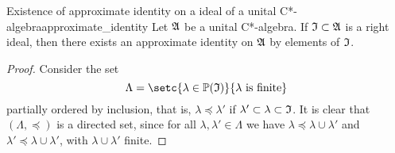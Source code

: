 \begin{theorem}{Existence of approximate identity on a ideal of a unital C*-algebra}{approximate_identity}
    Let \(\mathfrak{A}\) be a unital C*-algebra. If \(\mathfrak{I} \subset \mathfrak{A}\) is a right ideal, then there exists an approximate identity on \(\mathfrak{A}\) by elements of \(\mathfrak{I}\).
\end{theorem}
\begin{proof}
    Consider the set
    \begin{equation*}
        \Lambda = \setc{\lambda \in \mathbb{P}(\algebra{I})}{\lambda\text{ is finite}}
    \end{equation*}
    partially ordered by inclusion, that is, \(\lambda \preceq \lambda'\) if \(\lambda' \subset \lambda \subset \mathfrak{I}\). It is clear that \((\Lambda, \preceq)\) is a directed set, since for all \(\lambda, \lambda' \in \Lambda\) we have \(\lambda \preceq \lambda \cup \lambda'\) and \(\lambda' \preceq \lambda \cup \lambda'\), with \(\lambda \cup \lambda'\) finite.


\end{proof}
